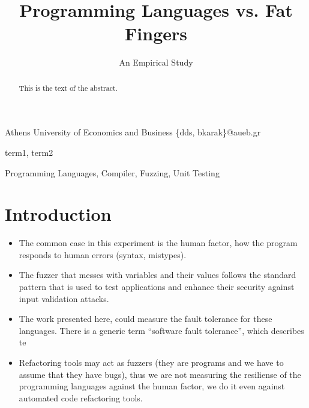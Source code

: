 \documentclass[10pt]{sigplanconf}
\begin{document}
\copyrightdata{[to be supplied]}


\title{Programming Languages vs. Fat Fingers}
\subtitle{An Empirical Study}

           {Athens University of Economics and Business}
           {\{dds, bkarak\}@aueb.gr}

\maketitle

\begin{abstract}
This is the text of the abstract.
\end{abstract}


\terms
term1, term2

\keywords
Programming Languages, Compiler, Fuzzing, Unit Testing

\section{Introduction} %

\cite{C99}

\begin{itemize}
	\item The common case in this experiment is the human factor, how the program responds to human errors (syntax, mistypes).
	\item The fuzzer that messes with variables and their values follows the standard pattern that is used to test applications and enhance their security against input validation attacks.
	\item The work presented here, could measure the fault tolerance for these languages. There is a generic term ``software fault tolerance'', which describes te
	\item Refactoring tools may act as fuzzers (they are programs and we have to assume that they have bugs), thus we are not measuring the resiliense of the programming languages against the human factor, we do it even against automated code refactoring tools.
\end{itemize}
\end{document}
